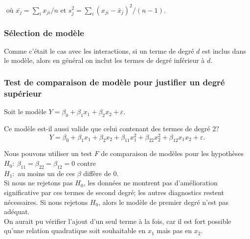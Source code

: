 $ \mbox{ o\`u } \bar{x_j}=\sum_ix_{ji}/n \mbox{ et } s_j^2=\sum_i(x_{ji}-\bar{x}_j)^2/(n-1).$

\subsubsection*{Sélection de modèle}

Comme c'était le cas avec les interactions, si un terme de
degré $d$ est inclus dans le modèle, alors en général on
inclut les termes de degré inférieur \`a $d$.%




\subsubsection*{Test de comparaison de modèle pour justifier un degré supérieur}


\begin{exemple}
Soit le modèle
$Y=\beta_0+\beta_1x_{1}+\beta_2x_{2}+\varepsilon.$

Ce modèle est-il aussi valide que celui contenant des termes de degré 2?
$$Y=\beta_0+\beta_1x_{1}+\beta_2x_{2}+\beta_{11}x_{1}^2
+\beta_{22}x_{2}^2+ \beta_{12}x_{1}x_{2}+\varepsilon.$$

Nous pouvons utiliser un test $F$ de comparaison de modèles pour les hypothèses\\
$H_0:\ \beta_{11}=\beta_{22}=\beta_{12}=0$ contre \\
$H_1:$ au moins un de ces $\beta$ diffère de 0. \\

Si nous ne rejetons pas $H_0$, les données ne montrent pas d'amélioration significative par ces termes de second degré; les autres diagnostics restent nécessaires. Si nous rejetons $H_0$, alors le modèle de premier degré n'est pas adéquat.\\

On aurait pu vérifier l'ajout d'un seul terme à la fois, car il est fort possible qu'une relation quadratique soit souhaitable en $x_1$ mais pas en $x_2$.
\end{exemple}


